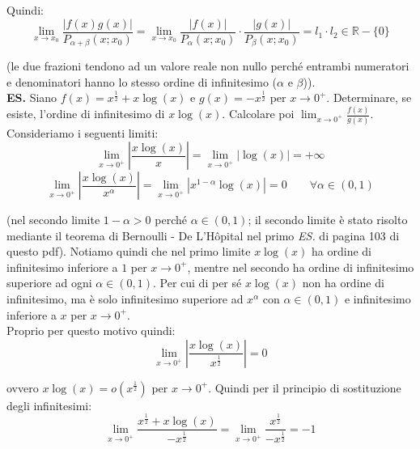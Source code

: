 \documentclass{article}
\begin{document}
\noindent Quindi:
\begin{equation*}
\lim_{x \to x_0} \frac{|f(x)g(x)|}{P_{\alpha + \beta}(x;x_0)} = \lim_{x \to x_0} \frac{|f(x)|}{P_\alpha(x; x_0)} \cdot \frac{|g(x)|}{P_\beta(x; x_0)} = l_1 \cdot l_2 \in \mathbb{R} - \{0\}
\end{equation*}

\noindent (le due frazioni tendono ad un valore reale non nullo perché entrambi numeratori e denominatori hanno lo stesso ordine di infinitesimo ($\alpha$ e $\beta$)).\\

\noindent\textbf{ES.} Siano $f(x) = x^\frac{1}{2} + x\log(x)$ e $g(x) = - x^\frac{1}{2}$ per $x \to 0^+$. Determinare, se esiste, l'ordine di infinitesimo di $x\log(x)$. Calcolare poi $\lim_{x \to 0^+} \frac{f(x)}{g(x)}$.\\
Consideriamo i seguenti limiti:
\begin{equation*}
    \lim_{x \to 0^+} \left|\frac{x\log(x)}{x}\right| = \lim_{x \to 0^+} |\log(x)| = +\infty
\end{equation*}
\begin{equation*}
    \lim_{x \to 0^+} \left|\frac{x\log(x)}{x^\alpha}\right| = \lim_{x \to 0^+} |x^{1 - \alpha}\log(x)| = 0 \qquad \forall \alpha \in (0, 1)
\end{equation*}

\noindent (nel secondo limite $1 - \alpha > 0$ perché $\alpha \in (0, 1)$; il secondo limite è stato risolto mediante il teorema di Bernoulli - De L'Hôpital nel primo \textit{ES.} di pagina 103 di questo pdf). Notiamo quindi che nel primo limite $x\log(x)$ ha ordine di infinitesimo inferiore a $1$ per $x \to 0^+$, mentre nel secondo ha ordine di infinitesimo superiore ad ogni $\alpha \in (0, 1)$. Per cui di per sé $x\log(x)$ non ha ordine di infinitesimo, ma è solo infinitesimo superiore ad $x^\alpha$ con $\alpha \in (0, 1)$ e infinitesimo inferiore a $x$ per $x \to 0^+$.\\
Proprio per questo motivo quindi:
\begin{equation*}
    \lim_{x \to 0^+} \left|\frac{x\log(x)}{x^\frac{1}{2}}\right| = 0
\end{equation*}

\noindent ovvero $x\log(x) = o(x^\frac{1}{2})$ per $x \to 0^+$. Quindi per il principio di sostituzione degli infinitesimi:
\begin{equation*}
    \lim_{x \to 0^+} \frac{x^\frac{1}{2} + x\log(x)}{-x^\frac{1}{2}} = \lim_{x \to 0^+} \frac{x^\frac{1}{2}}{-x^\frac{1}{2}} = -1
\end{equation*}
\end{document}
